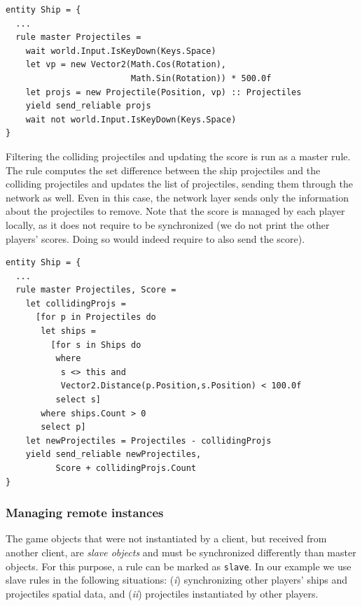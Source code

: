 \begin{enumerate}
\begin{lstlisting}
entity Ship = {
  ...
  rule master Projectiles =
    wait world.Input.IsKeyDown(Keys.Space)
    let vp = new Vector2(Math.Cos(Rotation), 
                         Math.Sin(Rotation)) * 500.0f
    let projs = new Projectile(Position, vp) :: Projectiles
    yield send_reliable projs
    wait not world.Input.IsKeyDown(Keys.Space)
}
\end{lstlisting}

	Filtering the colliding projectiles and updating the score is run as a master rule. The rule computes the set difference between the ship projectiles and the colliding projectiles and updates the list of projectiles, sending them through the network as well. Even in this case, the network layer sends only the information about the projectiles to remove. Note that the score is managed by each player locally, as it does not require to be synchronized (we do not print the other players' scores. Doing so would indeed require to also send the score).
	
\begin{lstlisting}
entity Ship = {
  ...
  rule master Projectiles, Score =
    let collidingProjs =
      [for p in Projectiles do
       let ships =
         [for s in Ships do
          where 
           s <> this and 
           Vector2.Distance(p.Position,s.Position) < 100.0f
          select s]
       where ships.Count > 0
       select p]
    let newProjectiles = Projectiles - collidingProjs
    yield send_reliable newProjectiles, 
          Score + collidingProjs.Count 
}
\end{lstlisting}
\end{enumerate}

\subsubsection{Managing remote instances}
The game objects that were not instantiated by a client, but received from another client, are \textit{slave objects} and must be synchronized differently than master objects. For this purpose, a rule can be marked as \texttt{slave}. In our example we use slave rules in the following situations: (\textit{i}) synchronizing other players' ships and projectiles spatial data, and (\textit{ii}) projectiles instantiated by other players.

